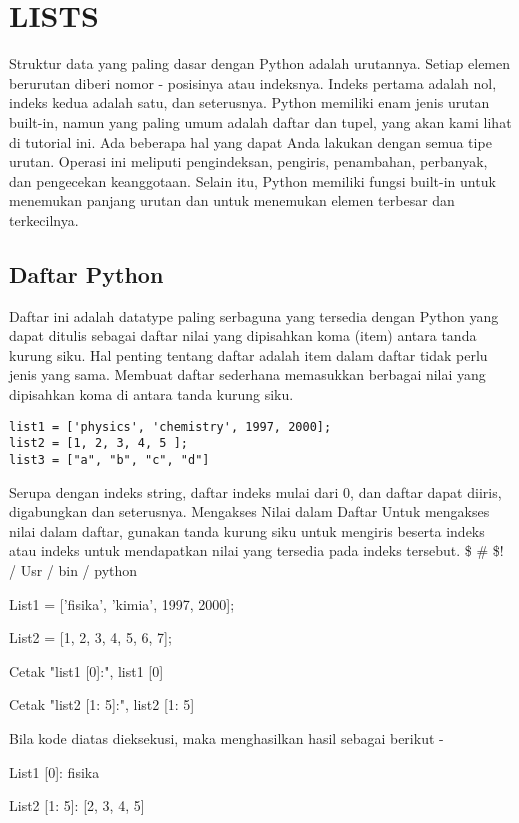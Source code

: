 \section{LISTS}
Struktur data yang paling dasar dengan Python adalah urutannya. Setiap elemen berurutan diberi nomor - posisinya atau indeksnya. Indeks pertama adalah nol, indeks kedua adalah satu, dan seterusnya.
\vspace{12pt}
Python memiliki enam jenis urutan built-in, namun yang paling umum adalah daftar dan tupel, yang akan kami lihat di tutorial ini.
Ada beberapa hal yang dapat Anda lakukan dengan semua tipe urutan. Operasi ini meliputi pengindeksan, pengiris, penambahan, perbanyak, dan pengecekan keanggotaan. Selain itu, Python memiliki fungsi built-in untuk menemukan panjang urutan dan untuk menemukan elemen terbesar dan terkecilnya.
\vspace{12pt}
\subsection{Daftar Python}
\vspace{12pt}
Daftar ini adalah datatype paling serbaguna yang tersedia dengan Python yang dapat ditulis sebagai daftar nilai yang dipisahkan koma (item) antara tanda kurung siku. Hal penting tentang daftar adalah item dalam daftar tidak perlu jenis yang sama.
Membuat daftar sederhana memasukkan berbagai nilai yang dipisahkan koma di antara tanda kurung siku.
\vspace{12pt}
\begin{verbatim}
list1 = ['physics', 'chemistry', 1997, 2000];
list2 = [1, 2, 3, 4, 5 ];
list3 = ["a", "b", "c", "d"]
\end{verbatim}
Serupa dengan indeks string, daftar indeks mulai dari 0, dan daftar dapat diiris, digabungkan dan seterusnya.
Mengakses Nilai dalam Daftar
Untuk mengakses nilai dalam daftar, gunakan tanda kurung siku untuk mengiris beserta indeks atau indeks untuk mendapatkan nilai yang tersedia pada indeks tersebut.
\vspace{12pt}
 \$  \#  \$! / Usr / bin / python \par
\vspace{12pt}
List1 = ['fisika', 'kimia', 1997, 2000]; \par
List2 = [1, 2, 3, 4, 5, 6, 7]; \par
\vspace{12pt}
Cetak "list1 [0]:", list1 [0] \par
Cetak "list2 [1: 5]:", list2 [1: 5] \par
\vspace{12pt}
Bila kode diatas dieksekusi, maka menghasilkan hasil sebagai berikut - \par
\vspace{12pt}
List1 [0]: fisika \par
List2 [1: 5]: [2, 3, 4, 5] \par
\vspace{12pt}

